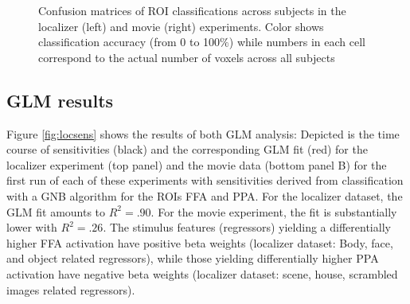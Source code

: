 \documentclass[a4paper, 12pt]{scrreprt}
\begin{document}
\begin{figure}[H]

	\caption[Classification results in two proof-of-concept analyses]{\small{Confusion matrices of ROI classifications across subjects in the localizer (left) and movie (right) experiments. Color shows classification accuracy (from 0 to 100$\%$) while numbers in each cell correspond to the actual number of voxels across all subjects }}
	\label{fig:CV}
\end{figure}




\subsection{GLM results}\label{sec:c1_glm_res}

Figure \ref{fig:locsens} shows the results of both GLM analysis: Depicted is the time course of sensitivities (black) and the corresponding GLM fit (red) for the localizer experiment (top panel) and the movie data (bottom panel B) for the first run of each of these experiments with sensitivities derived from classification with a GNB algorithm for the ROIs FFA and PPA. For the localizer dataset, the GLM fit amounts to $R^2 = .90$. For the movie experiment, the fit is substantially lower with $R^2 = .26$. The stimulus features (regressors) yielding a differentially higher FFA activation have positive beta weights (localizer dataset: Body, face, and object related regressors), while those yielding differentially higher PPA activation have negative beta weights (localizer dataset: scene, house, scrambled images related regressors).
\end{document}
